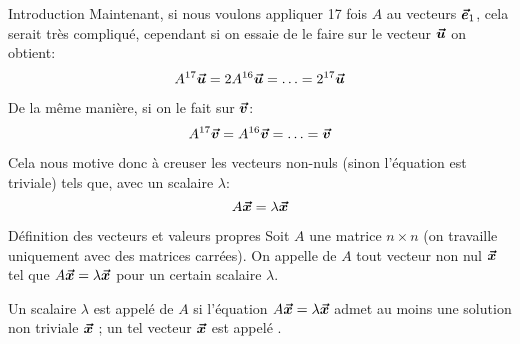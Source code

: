 \documentclass[a4paper]{article}
\begin{document}
\begin{parag}{Introduction}
    Maintenant, si nous voulons appliquer 17 fois $A$ au vecteurs $\bm{\protect\vec{e}}_1$, cela serait très compliqué, cependant si on essaie de le faire sur le vecteur $\bm{\protect\vec{u}}$ on obtient: 
    \[A^{17} \bm{\protect\vec{u}} = 2A^{16} \bm{\protect\vec{u}} = \ldots = 2^{17} \bm{\protect\vec{u}}\]
    
    De la même manière, si on le fait sur $\bm{\protect\vec{v}}$: 
    \[A^{17} \bm{\protect\vec{v}} = A^{16} \bm{\protect\vec{v}} = \ldots = \bm{\protect\vec{v}}\]

    Cela nous motive donc à creuser les vecteurs non-nuls (sinon l'équation est triviale) tels que, avec un scalaire $\lambda$: 
    \[A \bm{\protect\vec{x}} = \lambda \bm{\protect\vec{x}}\]
\end{parag}

\begin{parag}{Définition des vecteurs et valeurs propres}
    Soit $A$ une matrice $n \times n$ (on travaille uniquement avec des matrices carrées). On appelle  de $A$ tout vecteur non nul $\bm{\protect\vec{x}}$ tel que $A \bm{\protect\vec{x}} = \lambda \bm{\protect\vec{x}}$ pour un certain scalaire $\lambda$.

    Un scalaire $\lambda$ est appelé  de $A$ si l'équation $A \bm{\protect\vec{x}} = \lambda \bm{\protect\vec{x}}$ admet au moins une solution non triviale $\bm{\protect\vec{x}}$ ; un tel vecteur $\bm{\protect\vec{x}}$ est appelé .

\end{parag}
\end{document}
